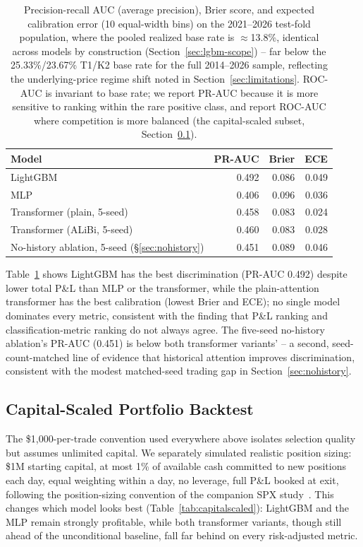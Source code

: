 \documentclass[sigconf,review,anonymous]{acmart}
\begin{document}
\begin{table}[t]
\footnotesize
\begin{tabular}{lrrr}
\toprule
Model & PR-AUC & Brier & ECE \\
\midrule
LightGBM & 0.492 & 0.086 & 0.049 \\
MLP & 0.406 & 0.096 & 0.036 \\
Transformer (plain, 5-seed) & 0.458 & 0.083 & 0.024 \\
Transformer (ALiBi, 5-seed) & 0.460 & 0.083 & 0.028 \\
No-history ablation, 5-seed (\S\ref{sec:nohistory}) & 0.451 & 0.089 & 0.046 \\
\bottomrule
\end{tabular}
\caption{Precision-recall AUC (average precision), Brier score, and expected calibration error (10 equal-width bins) on the 2021--2026 test-fold population, where the pooled realized base rate is $\approx$13.8\%, identical across models by construction (Section~\ref{sec:lgbm-scope}) -- far below the 25.33\%/23.67\% T1/K2 base rate for the full 2014--2026 sample, reflecting the underlying-price regime shift noted in Section~\ref{sec:limitations}. ROC-AUC is invariant to base rate; we report PR-AUC because it is more sensitive to ranking within the rare positive class, and report ROC-AUC where competition is more balanced (the capital-scaled subset, Section~\ref{sec:capitalscaled}).}
\label{tab:calibration}
\end{table}

Table~\ref{tab:calibration} shows LightGBM has the best discrimination (PR-AUC 0.492) despite lower total P\&L than MLP or the transformer, while the plain-attention transformer has the best calibration (lowest Brier and ECE); no single model dominates every metric, consistent with the finding that P\&L ranking and classification-metric ranking do not always agree. The five-seed no-history ablation's PR-AUC (0.451) is below both transformer variants' -- a second, seed-count-matched line of evidence that historical attention improves discrimination, consistent with the modest matched-seed trading gap in Section~\ref{sec:nohistory}.

\subsection{Capital-Scaled Portfolio Backtest}
\label{sec:capitalscaled}
The \$1,000-per-trade convention used everywhere above isolates selection quality but assumes unlimited capital. We separately simulated realistic position sizing: \$1M starting capital, at most 1\% of available cash committed to new positions each day, equal weighting within a day, no leverage, full P\&L booked at exit, following the position-sizing convention of the companion SPX study~\cite{glasserman2025tp2}. This changes which model looks best (Table~\ref{tab:capitalscaled}): LightGBM and the MLP remain strongly profitable, while both transformer variants, though still ahead of the unconditional baseline, fall far behind on every risk-adjusted metric.
\end{document}
